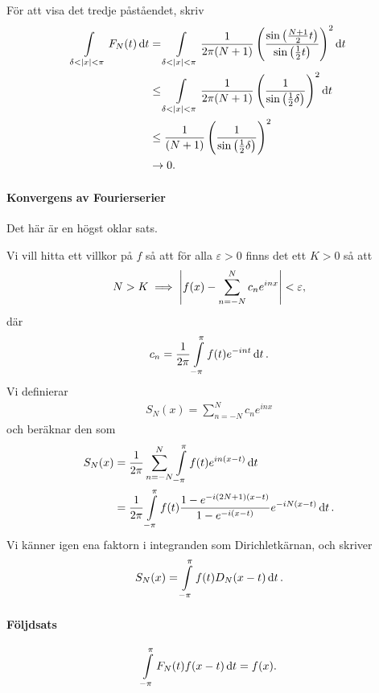 För att visa det tredje påståendet, skriv
\begin{align*}
	\int\limits_{\delta < \abs{x} < \pi}^{}F_{N}(t)\dd{t} &= \int\limits_{\delta < \abs{x} < \pi}^{}\frac{1}{2\pi (N + 1)}\left(\frac{\sin{\left(\frac{N + 1}{2}t\right)}}{\sin{\left(\frac{1}{2}t\right)}}\right)^{2}\dd{t} \\
	                                                &\leq \int\limits_{\delta < \abs{x} < \pi}^{}\frac{1}{2\pi (N + 1)}\left(\frac{1}{\sin{\left(\frac{1}{2}\delta\right)}}\right)^{2}\dd{t} \\
	                                                &\leq \frac{1}{(N + 1)}\left(\frac{1}{\sin{\left(\frac{1}{2}\delta\right)}}\right)^{2} \\
	                                                &\to 0. 
\end{align*}

\paragraph{Konvergens av Fourierserier}
Det här är en högst oklar sats.

\proof
Vi vill hitta ett villkor på $f$ så att för alla $\varepsilon > 0$ finns det ett $K > 0$ så att
\begin{align*}
	N > K \implies \abs{f(x) - \sum\limits_{n = -N}^{N}c_{n}e^{inx}} < \varepsilon,
\end{align*}
där
\begin{align*}
	c_{n} = \frac{1}{2\pi}\int\limits_{-\pi}^{\pi}f(t)e^{-int}\dd{t}.
\end{align*}
Vi definierar
\begin{align*}
	S_{N}(x) = \sum\limits_{n = -N}^{N}c_{n}e^{inx}
\end{align*}
och beräknar den som
\begin{align*}
	S_{N}(x) &= \frac{1}{2\pi}\sum\limits_{n = -N}^{N}\int\limits_{-\pi}^{\pi}f(t)e^{in(x - t)}\dd{t} \\
	         &= \frac{1}{2\pi}\int\limits_{-\pi}^{\pi}f(t)\frac{1 - e^{-i(2N + 1)(x - t)}}{1 - e^{-i(x - t)}}e^{-iN(x - t)}\dd{t}.
\end{align*}
Vi känner igen ena faktorn i integranden som Dirichletkärnan, och skriver
\begin{align*}
	S_{N}(x) = \int\limits_{-\pi}^{\pi}f(t)D_{N}(x - t)\dd{t}.
\end{align*}

\paragraph{Följdsats}
\begin{align*}
	\int\limits_{-\pi}^{\pi}F_{N}(t)f(x - t)\dd{t} = f(x).
\end{align*}

